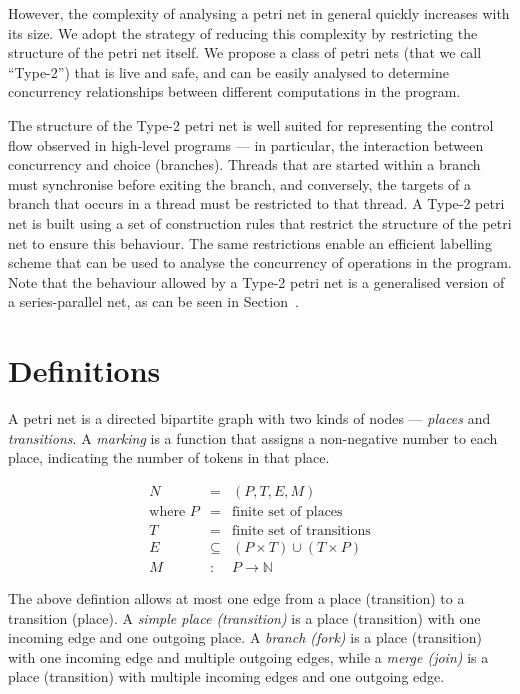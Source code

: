 \documentclass[12pt,a4paper]{article}
\begin{document}
However, the complexity of analysing a petri net in general quickly
increases with its size. We adopt the strategy of reducing this
complexity by restricting the structure of the petri net itself. We
propose a class of petri nets (that we call ``Type-2'') that is live
and safe, and can be easily analysed to determine concurrency
relationships between different computations in the program.

The structure of the Type-2 petri net is well suited for representing
the control flow observed in high-level programs --- in particular,
the interaction between concurrency and choice (branches). Threads
that are started within a branch must synchronise before exiting the
branch, and conversely, the targets of a branch that occurs in a
thread must be restricted to that thread. A Type-2 petri net is built
using a set of construction rules that restrict the structure of the
petri net to ensure this behaviour. The same restrictions enable an
efficient labelling scheme that can be used to analyse the concurrency
of operations in the program. Note that the behaviour allowed by a
Type-2 petri net is a generalised version of a series-parallel
net\cite{something}, as can be seen in Section~\cite{sec:somewhere}.

\section{Definitions}
\label{sec:defintions}

A petri net is a directed bipartite graph with two kinds of nodes ---
\textit{places} and \textit{transitions}. A \textit{marking} is a
function that assigns a non-negative number to each place, indicating
the number of tokens in that place.

\begin{eqnarray*}
  N & = & (P, T, E, M)\\
  \textrm{where } P & = & \textrm{finite set of places}\\
  T & = & \textrm{finite set of transitions}\\
  E & \subseteq & (P \times T) \cup (T \times P)\\
  M & : & P \rightarrow \mathbb{N}
\end{eqnarray*}

The above defintion allows at most one edge from a place (transition)
to a transition (place). A \textit{simple place (transition)} is a
place (transition) with one incoming edge and one outgoing place. A
\textit{branch (fork)} is a place (transition) with one incoming edge
and multiple outgoing edges, while a \textit{merge (join)} is a place
(transition) with multiple incoming edges and one outgoing edge. 
\end{document}
